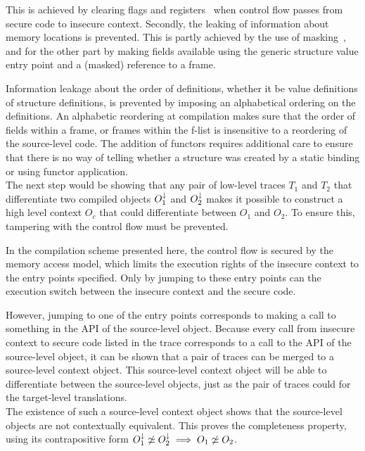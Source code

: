 This is achieved by clearing flags and registers~\cite{Agten:2012:SCM:2354412.2355247} when control flow passes from secure code to insecure context.
Secondly, the leaking of information about memory locations is prevented.
This is partly achieved by the use of masking~\cite{Patrignani}, and for the other part by making fields available using the generic structure value entry point and a (masked) reference to a frame.

Information leakage about the order of definitions, whether it be value definitions of structure definitions, is prevented by imposing an alphabetical ordering on the definitions.
An alphabetic reordering at compilation makes sure that the order of fields within a frame, or frames within the f-list is insensitive to a reordering of the source-level code.
The addition of functors requires additional care to ensure that there is no way of telling whether a structure was created by a static binding or using functor application.
\\[1em]
The next step would be showing that any pair of low-level traces $T_1$ and $T_2$ that differentiate two compiled objects $O_1^{\downarrow}$ and $O_2^{\downarrow}$ makes it possible to construct a high level context $O_c$ that could differentiate between $O_1$ and $O_2$.
To ensure this, tampering with the control flow must be prevented.

In the compilation scheme presented here, the control flow is secured by the memory access model, which limits the execution rights of the insecure context to the entry points specified.
Only by jumping to these entry points can the execution switch between the insecure context and the secure code.

However, jumping to one of the entry points corresponds to making a call to something in the API of the source-level object.
Because every call from insecure context to secure code listed in the trace corresponds to a call to the API of the source-level object, it can be shown that a pair of traces can be merged to a source-level context object. 
This source-level context object will be able to differentiate between the source-level objects, just as the pair of traces could for the target-level translations.
\\[1em]
The existence of such a source-level context object shows that the source-level objects are not contextually equivalent.
This proves the completeness property, using its contrapositive form $O_{1}^{\downarrow} \not\simeq O_{2}^{\downarrow} \implies O_{1} \not\simeq O_{2}$.
